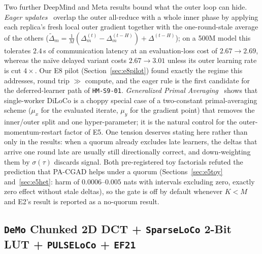 \documentclass[11pt,a4paper]{article}
\begin{document}
Two further DeepMind and Meta results bound what the outer loop can hide. \emph{Eager updates}~\cite{kale2025eager} overlap the outer all-reduce with a whole inner phase by applying each replica's fresh local outer gradient together with the one-round-stale average of the others ($\tilde\Delta_m = \tfrac{1}{M}(\Delta_m^{(t)} - \Delta_m^{(t-H)}) + \Delta^{(t-H)}$); on a 500M model this tolerates $2.4$\,s of communication latency at an evaluation-loss cost of $2.67 \to 2.69$, whereas the na\"ive delayed variant costs $2.67 \to 3.01$ unless its outer learning rate is cut $4\times$. Our E8 pilot (Section~\ref{sec:e8pilot}) found exactly the regime this addresses, round trip $\gg$ compute, and the eager rule is the first candidate for the deferred-learner path of \texttt{HM-S9-01}. \emph{Generalized Primal Averaging}~\cite{defazio2025gpa} shows that single-worker DiLoCo is a choppy special case of a two-constant primal-averaging scheme ($\mu_x$ for the evaluated iterate, $\mu_y$ for the gradient point) that removes the inner/outer split and one hyper-parameter; it is the natural control for the outer-momentum-restart factor of E5. One tension deserves stating here rather than only in the results: when a quorum already excludes late learners, the deltas that arrive one round late are usually still directionally correct, and down-weighting them by $\sigma(\tau)$ discards signal. Both pre-registered toy factorials refuted the prediction that PA-CGAD helps under a quorum (Sections~\ref{sec:e5toy} and~\ref{sec:e5het}: harm of $0.0006$--$0.005$ nats with intervals excluding zero, exactly zero effect without stale deltas), so the gate is off by default whenever $K < M$ and E2's result is reported as a no-quorum result.

\subsection{\texttt{DeMo} Chunked 2D DCT + \texttt{SparseLoCo} 2-Bit LUT + \texttt{PULSELoCo} + \texttt{EF21}}
\end{document}
